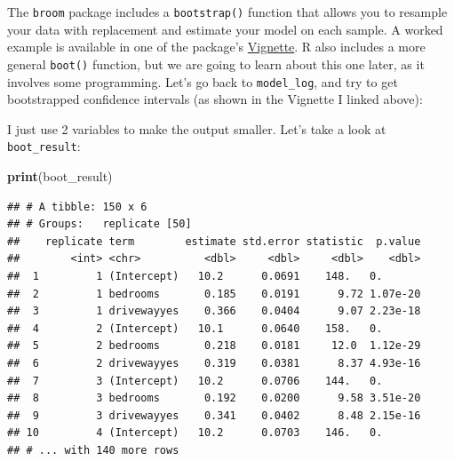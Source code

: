 \documentclass[]{gitbook}
\newenvironment{Shaded}{\begin{snugshade}}{\end{snugshade}}
\newcommand{\DataTypeTok}[1]{\textcolor[rgb]{0.13,0.29,0.53}{#1}}
\newcommand{\DecValTok}[1]{\textcolor[rgb]{0.00,0.00,0.81}{#1}}
\newcommand{\KeywordTok}[1]{\textcolor[rgb]{0.13,0.29,0.53}{\textbf{#1}}}
\newcommand{\NormalTok}[1]{#1}
\newcommand{\OperatorTok}[1]{\textcolor[rgb]{0.81,0.36,0.00}{\textbf{#1}}}
\newcommand{\StringTok}[1]{\textcolor[rgb]{0.31,0.60,0.02}{#1}}
\theoremstyle{definition}
\theoremstyle{definition}
\theoremstyle{definition}
\theoremstyle{remark}
\begin{document}
The \texttt{broom} package includes a \texttt{bootstrap()} function that
allows you to resample your data with replacement and estimate your
model on each sample. A worked example is available in one of the
package's
\href{https://cran.r-project.org/web/packages/broom/vignettes/bootstrapping.html}{Vignette}.
R also includes a more general \texttt{boot()} function, but we are
going to learn about this one later, as it involves some programming.
Let's go back to \texttt{model\_log}, and try to get bootstrapped
confidence intervals (as shown in the Vignette I linked above):

\begin{Shaded}
\end{Shaded}

I just use 2 variables to make the output smaller. Let's take a look at
\texttt{boot\_result}:

\begin{Shaded}
\begin{Highlighting}[]
\KeywordTok{print}\NormalTok{(boot_result)}
\end{Highlighting}
\end{Shaded}

\begin{verbatim}
## # A tibble: 150 x 6
## # Groups:   replicate [50]
##    replicate term        estimate std.error statistic  p.value
##        <int> <chr>          <dbl>     <dbl>     <dbl>    <dbl>
##  1         1 (Intercept)   10.2      0.0691    148.   0.      
##  2         1 bedrooms       0.185    0.0191      9.72 1.07e-20
##  3         1 drivewayyes    0.366    0.0404      9.07 2.23e-18
##  4         2 (Intercept)   10.1      0.0640    158.   0.      
##  5         2 bedrooms       0.218    0.0181     12.0  1.12e-29
##  6         2 drivewayyes    0.319    0.0381      8.37 4.93e-16
##  7         3 (Intercept)   10.2      0.0706    144.   0.      
##  8         3 bedrooms       0.192    0.0200      9.58 3.51e-20
##  9         3 drivewayyes    0.341    0.0402      8.48 2.15e-16
## 10         4 (Intercept)   10.2      0.0703    146.   0.      
## # ... with 140 more rows
\end{verbatim}
\end{document}
